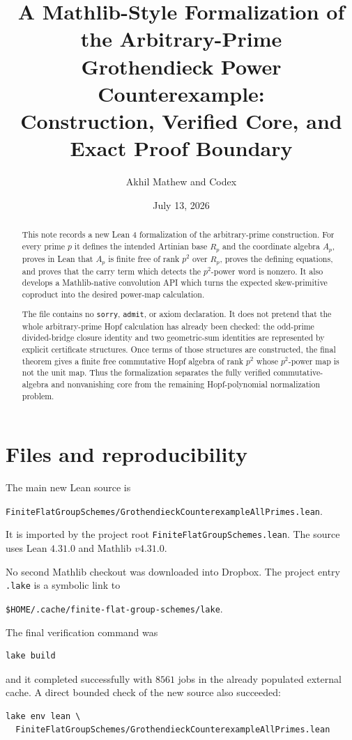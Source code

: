 \documentclass[11pt]{article}
\title{A Mathlib-Style Formalization of the Arbitrary-Prime\\
Grothendieck Power Counterexample:\\
Construction, Verified Core, and Exact Proof Boundary}
\author{Akhil Mathew and Codex}
\date{July 13, 2026}
\begin{document}
\maketitle

\begin{abstract}
This note records a new Lean 4 formalization of the arbitrary-prime construction.
For every prime $p$ it defines the intended Artinian base $R_p$ and the
coordinate algebra $A_p$, proves in Lean that $A_p$ is finite free of rank
$p^2$ over $R_p$, proves the defining equations, and proves that the carry
term which detects the $p^2$-power word is nonzero.  It also develops a
Mathlib-native convolution API which turns the expected skew-primitive
coproduct into the desired power-map calculation.

The file contains no \texttt{sorry}, \texttt{admit}, or axiom declaration.
It does not pretend that the whole arbitrary-prime Hopf calculation has
already been checked: the odd-prime divided-bridge closure identity and two
geometric-sum identities are represented by explicit certificate structures.
Once terms of those structures are constructed, the final theorem gives a
finite free commutative Hopf algebra of rank $p^2$ whose $p^2$-power map is
not the unit map.  Thus the formalization separates the fully verified
commutative-algebra and nonvanishing core from the remaining Hopf-polynomial
normalization problem.
\end{abstract}

\tableofcontents

\section{Files and reproducibility}

The main new Lean source is
\begin{center}
\texttt{FiniteFlatGroupSchemes/GrothendieckCounterexampleAllPrimes.lean}.
\end{center}
It is imported by the project root \texttt{FiniteFlatGroupSchemes.lean}.
The source uses Lean $4.31.0$ and Mathlib $v4.31.0$.

No second Mathlib checkout was downloaded into Dropbox.  The project entry
\texttt{.lake} is a symbolic link to
\begin{center}
\texttt{\$HOME/.cache/finite-flat-group-schemes/lake}.
\end{center}
The final verification command was
\begin{verbatim}
lake build
\end{verbatim}
and it completed successfully with $8561$ jobs in the already populated
external cache.  A direct bounded check of the new source also succeeded:
\begin{verbatim}
lake env lean \
  FiniteFlatGroupSchemes/GrothendieckCounterexampleAllPrimes.lean
\end{verbatim}
\end{document}
